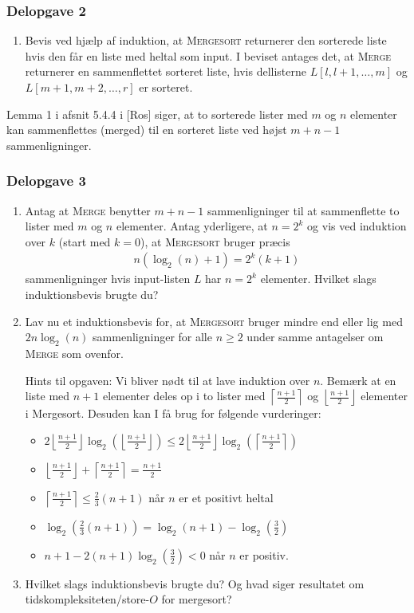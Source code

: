 \documentclass[a4paper,12pt]{article} 	%
\newcommand{\floor}[1]{\left\lfloor{#1}\right\rfloor}
\newcommand{\ceil}[1]{\left\lceil{#1}\right\rceil}
\begin{document}
\subsubsection*{Delopgave 2}
\begin{enumerate}
	\item Bevis ved hjælp af induktion, at \textsc{Mergesort} returnerer den sorterede liste hvis den får en liste med heltal som input. I beviset antages det, at \textsc{Merge} returnerer en sammenflettet sorteret liste, hvis dellisterne $L[l,l+1,\ldots,m]$ og $L[m+1,m+2,\ldots,r]$ er sorteret.
\end{enumerate}
Lemma 1 i afsnit 5.4.4 i [Ros] siger, at to sorterede lister med $m$ og $n$ elementer kan sammenflettes (merged) til en sorteret liste ved højst $m+n-1$ sammenligninger. 

\subsubsection*{Delopgave 3}
\begin{enumerate}
	\item Antag at \textsc{Merge} benytter $m+n-1$ sammenligninger til at sammenflette to lister med $m$ og $n$ elementer. Antag yderligere, at $n=2^k$ og vis ved induktion over $k$ (start med $k=0$), at \textsc{Mergesort} bruger præcis
	\begin{align*}
		n(\log_2(n)+1)=2^k(k+1)
	\end{align*}
	sammenligninger hvis input-listen $L$ har $n=2^k$ elementer. Hvilket slags induktionsbevis brugte du?
	\item Lav nu et induktionsbevis for, at \textsc{Mergesort} bruger mindre end eller lig med $2n\log_2(n)$ sammenligninger for alle $n\geq 2$ under samme antagelser om \textsc{Merge} som ovenfor. 
	
	Hints til opgaven: Vi bliver nødt til at lave induktion over $n$. Bemærk at en liste med $n+1$ elementer deles op i to lister med $\ceil{\frac{n+1}{2}}$ og $\floor{\frac{n+1}{2}}$ elementer i Mergesort. Desuden kan I få brug for følgende vurderinger:
	\begin{itemize}
		\item $2\floor{\frac{n+1}{2}}\log_2(\floor{\frac{n+1}{2}})\leq 2\floor{\frac{n+1}{2}}\log_2(\ceil{\frac{n+1}{2}})$
		\item $\floor{\frac{n+1}{2}}+\ceil{\frac{n+1}{2}}=\frac{n+1}{2}$
		\item $\ceil{\frac{n+1}{2}}\leq \frac{2}{3}(n+1)$ når $n$ er et positivt heltal
		\item $\log_2(\frac{2}{3}(n+1))=\log_2(n+1)-\log_2(\frac{3}{2})$
		\item $n+1-2(n+1)\log_2(\frac{3}{2})<0$ når $n$ er positiv.
	\end{itemize}	 
	
	\item Hvilket slags induktionsbevis brugte du? Og hvad siger resultatet om tidskompleksiteten/store-$O$ for mergesort?
\end{enumerate}
\end{document}
